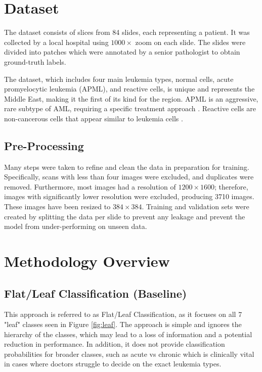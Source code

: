 \documentclass[runningheads]{llncs}
\begin{document}

\section{Dataset}

The dataset consists of slices from 84 slides, each representing a patient. It was collected by a local hospital using $1000\times$ zoom on each slide. The slides were divided into patches which were annotated by a senior pathologist to obtain ground-truth labels.

The dataset, which includes four main leukemia types, normal cells, acute promyelocytic leukemia (APML), and reactive cells, is unique and represents the Middle East, making it the first of its kind for the region. APML is an aggressive, rare subtype of AML, requiring a specific treatment approach \cite{apl_treatment}. Reactive cells are non-cancerous cells that appear similar to leukemia cells \cite{hamad2019lymphocytosis}. 

\subsection{Pre-Processing}
Many steps were taken to refine and clean the data in preparation for training. Specifically, scans with less than four images were excluded, and duplicates were removed. Furthermore, most images had a resolution of $1200\times1600$; therefore, images with significantly lower resolution were excluded, producing 3710 images. These images have been resized to $384\times384$. Training and validation sets were created by splitting the data per slide to prevent any leakage and prevent the model from under-performing on unseen data.


\section{Methodology Overview}

\subsection{Flat/Leaf Classification (Baseline)}

This approach is referred to as Flat/Leaf Classification, as it focuses on all 7 "leaf" classes seen in Figure \ref{fig:leaf}. The approach is simple and ignores the hierarchy of the classes, which may lead to a loss of information and a potential reduction in performance. In addition, it does not provide classification probabilities for broader classes, such as acute vs chronic which is clinically vital in cases where doctors struggle to decide on the exact leukemia types.
\end{document}
